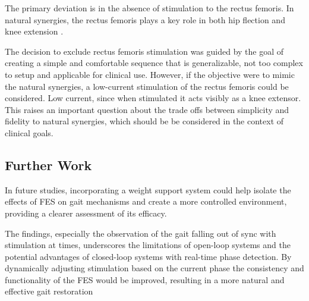 The primary deviation is in the absence of stimulation to the rectus femoris. In natural synergies, the rectus femoris plays a key role in both hip flection and knee extension . 

The decision to exclude rectus femoris stimulation was guided by the goal of creating a simple and comfortable sequence that is generalizable, not too complex to setup and applicable for clinical use. However, if the objective were to mimic the natural synergies, a low-current stimulation of the rectus femoris could be considered. Low current, since when stimulated it acts visibly as a knee extensor. This raises an important question about the trade offs between simplicity and fidelity to natural synergies, which should be be considered in the context of clinical goals.


\subsection{Further Work}
In future studies, incorporating a weight support system could help isolate the effects of FES on gait mechanisms and create a more controlled environment, providing a clearer assessment of its efficacy.

The findings, especially the observation of the gait falling out of sync with stimulation at times, underscores the limitations of open-loop systems and the potential advantages of closed-loop systems with real-time phase detection. By dynamically adjusting stimulation based on the current phase the consistency and functionality of the FES would be improved, resulting in a more natural and effective gait restoration



